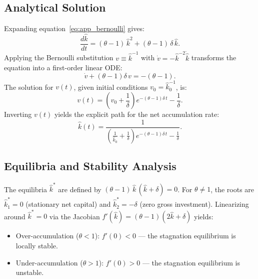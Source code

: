 \subsection{Analytical Solution}
\label{app:solution}

Expanding equation~\eqref{eq:app_bernoulli} gives:
\begin{equation}\label{eq:app_expanded}
    \frac{d\hat{k}}{dt} = (\theta - 1)\,\hat{k}^2 + (\theta - 1)\,\delta\,\hat{k}.
\end{equation}
Applying the Bernoulli substitution $v \equiv \hat{k}^{-1}$ with $\dot{v} = -\hat{k}^{-2}\dot{\hat{k}}$ transforms the equation into a first-order linear ODE:
\begin{equation}\label{eq:app_linear_standard}
    \dot{v} + (\theta - 1)\delta\,v = -(\theta - 1).
\end{equation}
The solution for $v(t)$, given initial conditions $v_0 = \hat{k}_0^{-1}$, is:
\begin{equation}\label{eq:app_v_simplified}
    v(t) = \left(v_0 + \frac{1}{\delta}\right) e^{-(\theta-1)\delta\,t} - \frac{1}{\delta}.
\end{equation}
Inverting $v(t)$ yields the explicit path for the net accumulation rate:
\begin{equation}\label{eq:app_khat_solution}
    \boxed{\hat{k}(t) = \frac{1}{\left(\frac{1}{\hat{k}_0} + \frac{1}{\delta}\right) e^{-(\theta-1)\delta\,t} - \frac{1}{\delta}}}.
\end{equation}

\subsection{Equilibria and Stability Analysis}
\label{app:stability}

The equilibria $\hat{k}^*$ are defined by $(\theta - 1)\,\hat{k}\,(\hat{k} + \delta) = 0$. For $\theta \neq 1$, the roots are $\hat{k}_1^* = 0$ (stationary net capital) and $\hat{k}_2^* = -\delta$ (zero gross investment). Linearizing around $\hat{k}^* = 0$ via the Jacobian $f'(\hat{k}) = (\theta - 1)(2\hat{k} + \delta)$ yields:
\begin{itemize}
    \item Over-accumulation ($\theta < 1$): $f'(0) < 0$ — the stagnation equilibrium is locally stable.
    \item Under-accumulation ($\theta > 1$): $f'(0) > 0$ — the stagnation equilibrium is unstable.
\end{itemize}

